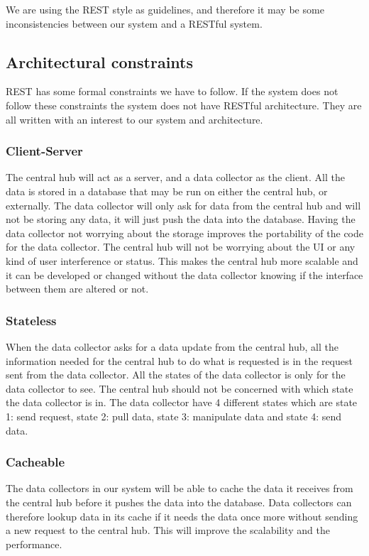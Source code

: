\documentclass[../document.tex]{subfiles}
\begin{document}
We are using the REST style as guidelines, and therefore it may be some inconsistencies between our system and a RESTful system. 

\subsection{Architectural constraints}
REST has some formal constraints we have to follow. If the system does not follow these constraints the system does not have RESTful architecture. They are all written with an interest to our system and architecture.

\subsubsection{Client-Server}
The central hub will act as a server, and a data collector as the client. All the data is stored in a database that may be run on either the central hub, or externally. The data collector will only ask for data from the central hub and will not be storing any data, it will just push the data into the database. Having the data collector not worrying about the storage improves the portability of the code for the data collector. The central hub will not be worrying about the UI or any kind of user interference or status. This makes the central hub more scalable and it can be developed or changed without the data collector knowing if the interface between them are altered or not. 

\subsubsection{Stateless}
When the data collector asks for a data update from the central hub, all the information needed for the central hub to do what is requested is in the request sent from the data collector. All the states of the data collector is only for the data collector to see. The central hub should not be concerned with which state the data collector is in. The data collector have 4 different states which are state 1: send request, state 2: pull data, state 3: manipulate data and state 4: send data.

\subsubsection{Cacheable}
The data collectors in our system will be able to cache the data it receives from the central hub before it pushes the data into the database. Data collectors can therefore lookup data in its cache if it needs the data once more without sending a new request to the central hub. This will improve the scalability and the performance. 
\end{document}
